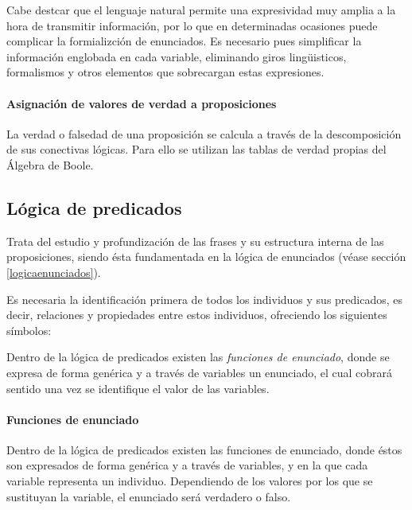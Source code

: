\documentclass[a4paper, 11pt, titlepage]{article}
\begin{document}
                Cabe destcar que el lenguaje natural permite una expresividad muy amplia a la hora de 
                transmitir información, por lo que en determinadas ocasiones puede complicar la 
                formializción de enunciados. Es necesario pues simplificar la información englobada en 
                cada variable, eliminando giros lingüisticos, formalismos y otros elementos que 
                sobrecargan estas expresiones.

            \paragraph{Asignación de valores de verdad a proposiciones}

                La verdad o falsedad de una proposición se calcula a través de la descomposición
                de sus conectivas lógicas. Para ello se utilizan las tablas de verdad propias del 
                Álgebra de Boole. 


    \subsection{Lógica de predicados}

        Trata del estudio y profundización de las frases y su estructura interna de las proposiciones, 
        siendo ésta fundamentada en la lógica de enunciados (véase sección \ref{logicaenunciados}).

        Es necesaria la identificación primera de todos los individuos y sus predicados, es decir, 
        relaciones y propiedades entre estos individuos, ofreciendo los siguientes símbolos:

        Dentro de la lógica de predicados existen las \textit{funciones de enunciado}, donde se expresa 
        de forma genérica y a través de variables un enunciado, el cual cobrará sentido una vez se 
        identifique el valor de las variables.

        \paragraph{Funciones de enunciado}

            Dentro de la lógica de predicados existen las funciones de enunciado, donde éstos son 
            expresados de forma genérica y a través de variables, y en la que cada variable representa 
            un individuo. Dependiendo de los valores por los que se sustituyan la variable, el enunciado 
            será verdadero o falso.
\end{document}
